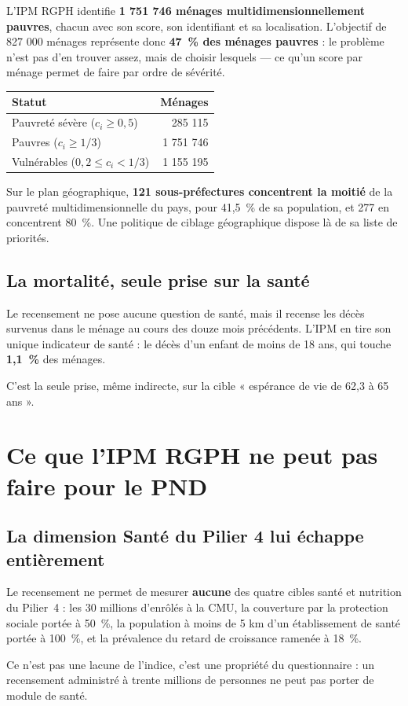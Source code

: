 \documentclass[11pt,a4paper]{article}
\begin{document}
L'IPM RGPH identifie \textbf{1 751 746 ménages multidimensionnellement pauvres}, chacun avec son
score, son identifiant et sa localisation. L'objectif de 827 000 ménages représente donc
\textbf{47~\% des ménages pauvres} : le problème n'est pas d'en trouver assez, mais de choisir
lesquels --- ce qu'un score par ménage permet de faire par ordre de sévérité.

\begin{center}
\begin{tabular}{@{}lr@{}}
\toprule
\textbf{Statut} & \textbf{Ménages} \\
\midrule
Pauvreté sévère ($c_i \ge 0{,}5$) & 285 115 \\
Pauvres ($c_i \ge 1/3$) & 1 751 746 \\
Vulnérables ($0{,}2 \le c_i < 1/3$) & 1 155 195 \\
\bottomrule
\end{tabular}
\end{center}

Sur le plan géographique, \textbf{121 sous-préfectures concentrent la moitié} de la pauvreté
multidimensionnelle du pays, pour 41,5~\% de sa population, et 277 en concentrent 80~\%. Une
politique de ciblage géographique dispose là de sa liste de priorités.

\subsection{La mortalité, seule prise sur la santé}

Le recensement ne pose aucune question de santé, mais il recense les décès survenus dans le ménage
au cours des douze mois précédents. L'IPM en tire son unique indicateur de santé : le décès d'un
enfant de moins de 18 ans, qui touche \textbf{1,1~\%} des ménages.

C'est la seule prise, même indirecte, sur la cible « espérance de vie de 62,3 à 65 ans ».

\section{Ce que l'IPM RGPH ne peut pas faire pour le PND}

\subsection{La dimension Santé du Pilier 4 lui échappe entièrement}

\begin{attention}
Le recensement ne permet de mesurer \textbf{aucune} des quatre cibles santé et nutrition du
Pilier~4 : les 30 millions d'enrôlés à la CMU, la couverture par la protection sociale portée à
50~\%, la population à moins de 5 km d'un établissement de santé portée à 100~\%, et la prévalence
du retard de croissance ramenée à 18~\%.

Ce n'est pas une lacune de l'indice, c'est une propriété du questionnaire : un recensement
administré à trente millions de personnes ne peut pas porter de module de santé.
\end{attention}
\end{document}
